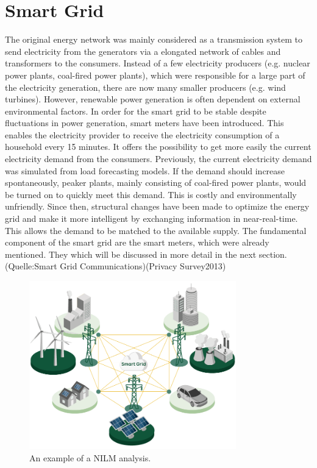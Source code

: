 \section{Smart Grid}
The original energy network was mainly considered as a transmission system to send electricity from the generators via a elongated network of cables and transformers to the consumers.%
Instead of a few electricity producers (e.g. nuclear power plants, coal-fired power plants), which were responsible for a large part of the electricity generation, there are now many smaller producers (e.g. wind turbines). %
However, renewable power generation is often dependent on external environmental factors. In order for the smart grid to be stable despite fluctuations in power generation, smart meters have been introduced.
This enables the electricity provider to receive the electricity consumption of a household every 15 minutes. It offers the possibility to get more easily the current electricity demand from the consumers. Previously, the current electricity demand was simulated from load forecasting models. If the demand should increase spontaneously, peaker plants, mainly consisting of coal-fired power plants, would be turned on to quickly meet this demand. This is costly and environmentally unfriendly. 
Since then, structural changes have been made to optimize the energy grid and make it more intelligent by exchanging information in near-real-time. This allows the demand to be matched to the available supply. The fundamental component of the smart grid are the smart meters, which were already mentioned. They which will be discussed in more detail in the next section.(Quelle:Smart Grid Communications)(Privacy Survey2013)\begin{figure}[tbp]
  \centering
  \includegraphics[width=0.8\textwidth]{images/Smart_Grid.png}
  \caption[Short description]{An example of a NILM analysis.}
  \label{fig:Appliance_Model}
\end{figure}

